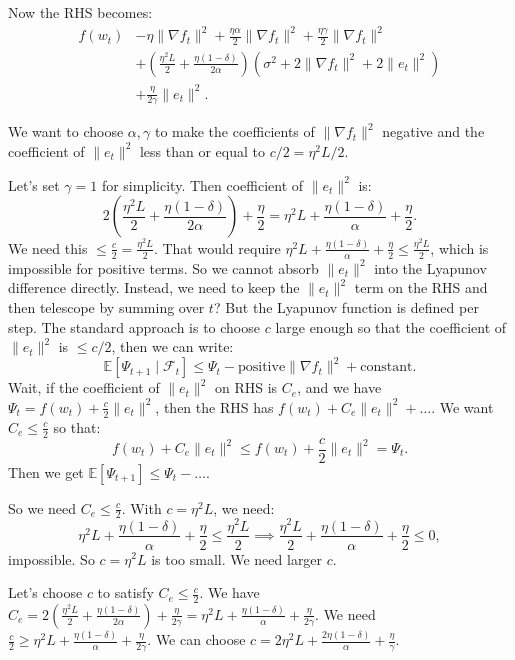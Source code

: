 \documentclass{article}
\begin{document}
Now the RHS becomes:
\begin{align*}
f(w_t) &- \eta \|\nabla f_t\|^2 + \frac{\eta \alpha}{2} \|\nabla f_t\|^2 + \frac{\eta \gamma}{2} \|\nabla f_t\|^2 \\
&+ \left( \frac{\eta^2 L}{2} + \frac{\eta(1-\delta)}{2\alpha} \right) \left( \sigma^2 + 2\|\nabla f_t\|^2 + 2\|e_t\|^2 \right) \\
&+ \frac{\eta}{2\gamma} \|e_t\|^2.
\end{align*}

We want to choose $\alpha, \gamma$ to make the coefficients of $\|\nabla f_t\|^2$ negative and the coefficient of $\|e_t\|^2$ less than or equal to $c/2 = \eta^2 L / 2$.

Let's set $\gamma = 1$ for simplicity. Then coefficient of $\|e_t\|^2$ is:
\[
2\left( \frac{\eta^2 L}{2} + \frac{\eta(1-\delta)}{2\alpha} \right) + \frac{\eta}{2} = \eta^2 L + \frac{\eta(1-\delta)}{\alpha} + \frac{\eta}{2}.
\]
We need this $\le \frac{c}{2} = \frac{\eta^2 L}{2}$. That would require $\eta^2 L + \frac{\eta(1-\delta)}{\alpha} + \frac{\eta}{2} \le \frac{\eta^2 L}{2}$, which is impossible for positive terms. So we cannot absorb $\|e_t\|^2$ into the Lyapunov difference directly. Instead, we need to keep the $\|e_t\|^2$ term on the RHS and then telescope by summing over $t$? But the Lyapunov function is defined per step. The standard approach is to choose $c$ large enough so that the coefficient of $\|e_t\|^2$ is $\le c/2$, then we can write:
\[
\mathbb{E}[\Psi_{t+1} \mid \mathcal{F}_t] \le \Psi_t - \text{positive} \|\nabla f_t\|^2 + \text{constant}.
\]
Wait, if the coefficient of $\|e_t\|^2$ on RHS is $C_e$, and we have $\Psi_t = f(w_t) + \frac{c}{2}\|e_t\|^2$, then the RHS has $f(w_t) + C_e \|e_t\|^2 + \dots$. We want $C_e \le \frac{c}{2}$ so that:
\[
f(w_t) + C_e \|e_t\|^2 \le f(w_t) + \frac{c}{2}\|e_t\|^2 = \Psi_t.
\]
Then we get $\mathbb{E}[\Psi_{t+1}] \le \Psi_t - \dots$.

So we need $C_e \le \frac{c}{2}$. With $c = \eta^2 L$, we need:
\[
\eta^2 L + \frac{\eta(1-\delta)}{\alpha} + \frac{\eta}{2} \le \frac{\eta^2 L}{2} \implies \frac{\eta^2 L}{2} + \frac{\eta(1-\delta)}{\alpha} + \frac{\eta}{2} \le 0,
\]
impossible. So $c = \eta^2 L$ is too small. We need larger $c$.

Let's choose $c$ to satisfy $C_e \le \frac{c}{2}$. We have $C_e = 2\left( \frac{\eta^2 L}{2} + \frac{\eta(1-\delta)}{2\alpha} \right) + \frac{\eta}{2\gamma} = \eta^2 L + \frac{\eta(1-\delta)}{\alpha} + \frac{\eta}{2\gamma}$.
We need $\frac{c}{2} \ge \eta^2 L + \frac{\eta(1-\delta)}{\alpha} + \frac{\eta}{2\gamma}$.
We can choose $c = 2\eta^2 L + \frac{2\eta(1-\delta)}{\alpha} + \frac{\eta}{\gamma}$.
\end{document}
